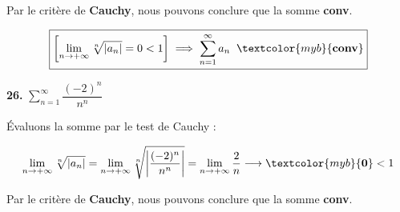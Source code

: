 \documentclass{report}
\begin{document}
    Par le critère de \textbf{Cauchy}, nous pouvons conclure que 
    la somme \textcolor{myb}{\textbf{conv}}. 

    \begin{align*}
    \boxed{
        \left[ 
        \lim\limits_{n \to+\infty } \sqrt[n]{|a_n|} = 0 < 1 
    \right] 
    \implies 
    \sum_{n=1}^{\infty }a_n \;\; \textcolor{myb}{\textbf{conv}} 
    }
    \end{align*}


    \vspace{1em}
    \noindent 
    \textbf{26.} $\sum_{n=1}^{\infty }\dfrac{(-2)^n}{n^n}$  


    Évaluons la somme par le test de Cauchy :

    \begin{align*}
        \lim\limits_{n \to+\infty }\sqrt[n]{|a_n|} 
        = 
        \lim\limits_{n \to+\infty } 
        \sqrt[n]{ \left| \dfrac{(-2)^n}{n^n} \right| } = 
        \lim\limits_{n \to+\infty } 
        \dfrac{2}{n} 
        \longrightarrow \textcolor{myb}{\textbf{0}} < 1  
    \end{align*}

    Par le critère de \textbf{Cauchy}, nous pouvons conclure que 
    la somme \textcolor{myb}{\textbf{conv}}. 
\end{document}
